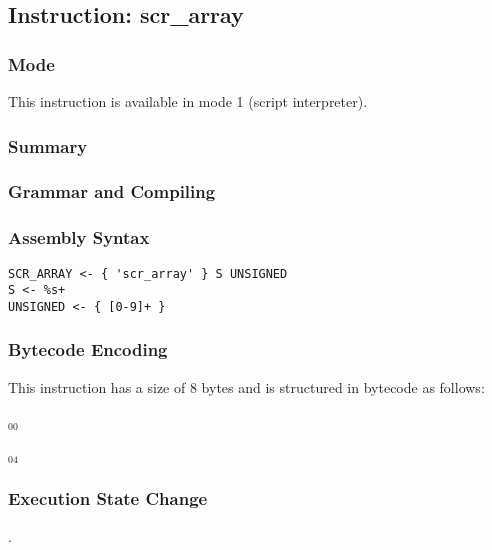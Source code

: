 \subsection{Instruction: scr\_array}

\subsubsection{Mode}
This instruction is available in mode 1 (script interpreter).
\subsubsection{Summary}


\subsubsection{Grammar and Compiling}


\subsubsection{Assembly Syntax}

\begin{myquote}
\begin{verbatim}
SCR_ARRAY <- { 'scr_array' } S UNSIGNED
S <- %s+
UNSIGNED <- { [0-9]+ }
\end{verbatim}
\end{myquote}

\subsubsection{Bytecode Encoding}

This instruction has a size of 8 bytes and is structured in bytecode as follows:

$_{00}$\ 



$_{04}$\ 


\subsubsection{Execution State Change}

.



